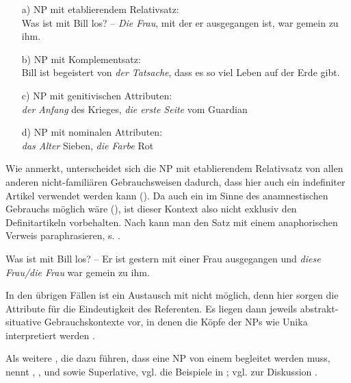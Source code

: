 \begin{itemize} 
 		\item[a)] \label{etab} NP  mit etablierendem Relativsatz: \\ Was ist mit Bill los? -- \textit{Die Frau}, mit der er ausgegangen ist, war gemein zu ihm. 
		\item[b)] \label{komp} NP  mit Komplementsatz: \\ Bill ist begeistert von \textit{der Tatsache}, dass es so viel Leben auf der Erde gibt. 
		\item[c)] \label{gen-attr} NP  mit  genitivischen Attributen: \\ \textit{der Anfang} des Krieges, \textit{die erste Seite} vom Guardian
		\item[d)] \label{n-attr} NP  mit nominalen Attributen: \\ \textit{das Alter} Sieben, \textit{die Farbe} Rot
\end{itemize}

Wie \textcite[38]{Himmelmann1997} anmerkt, unterscheidet sich die NP  mit etablierendem Relativsatz von allen anderen nicht-familiären Gebrauchsweisen dadurch, dass hier auch ein indefiniter Artikel  verwendet werden kann (). Da auch ein  im Sinne des anamnestischen  Gebrauchs möglich wäre (), ist dieser Kontext also nicht exklusiv den Definitartikeln vorbehalten. Nach \textcite[308]{Lobner1985} kann man den Satz mit einem anaphorischen  Verweis paraphrasieren, s. . %

\begin{exe}
	\ex \label{ex:bill} Was ist mit Bill los? -- Er ist gestern mit einer Frau ausgegangen und \textit{diese Frau/die Frau} war gemein zu ihm. 
\end{exe}

In den übrigen Fällen ist ein Austausch mit  nicht möglich, denn hier sorgen die Attribute für die Eindeutigkeit des Referenten. Es liegen dann jeweils abstrakt-situative  Gebrauchskontexte vor, in denen die Köpfe der NPs  wie Unika  interpretiert werden  \parencite[38]{Himmelmann1997}. 

Als weitere , die dazu führen, dass eine NP  von einem  begleitet werden muss, nennt  \textcite[148 und 228--230]{Hawkins1978} , ,  und  sowie  Superlative, vgl. die Beispiele in ; vgl. zur Diskussion \textcite[9]{Lyons1999}.

